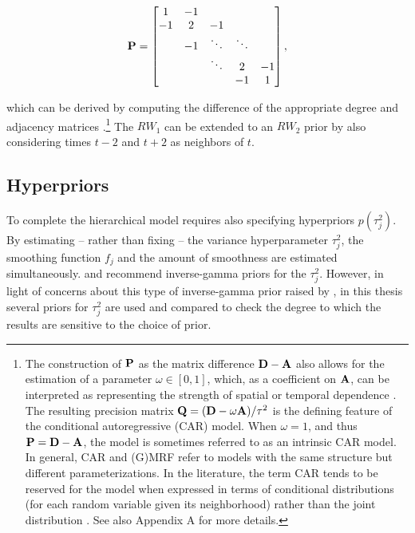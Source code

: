 \begin{equation*}
\mathbf{P} = 
\begin{bmatrix}
1  	& -1 	& 		& 	& \\
-1  	& 2 	& -1 		& 	& \\
  	& -1 & \ddots 	& \ddots	& \\
  	&  	& \ddots 	& 2 	& -1\\
  	&  	& 		& -1 	& 1\\
\end{bmatrix},
\end{equation*}

\noindent which can be derived by computing the difference of the appropriate degree 
and adjacency matrices .\footnote{The construction 
of $\mathbf{P}$ as the matrix difference $\mathbf{D} - \mathbf{A}$ also allows for the estimation 
of a parameter $\omega \in [0,1]$, which, as a coefficient on $\mathbf{A}$, can be 
interpreted as representing the strength of spatial or temporal dependence 
. The resulting precision matrix 
$\mathbf{Q}= (\mathbf{D} - \omega \mathbf{A})/\tau^2$ is the defining feature of the conditional 
autoregressive (CAR) model.  When $\omega = 1$, and thus $\mathbf{P}= \mathbf{D} - \mathbf{A}$, 
the model is sometimes referred to as an intrinsic CAR model. In general, CAR and (G)MRF 
refer to models with the same structure but different parameterizations. In the literature, the 
term CAR tends to be reserved for the model when expressed in terms of conditional 
distributions (for each random variable given its neighborhood) rather than the joint distribution . 
See also Appendix A %
for more details.\label{footnote_car}} 
The $RW_1$ can be extended to an $RW_2$ prior by also considering  
times $t-2$ and $t+2$ as neighbors of $t$. 


\subsection{Hyperpriors}
\label{hyperpriors}

To complete the hierarchical model requires also specifying hyperpriors $p(\tau_j^2)$.  
By estimating -- rather than fixing -- the variance hyperparameter $\tau_j^2$, the smoothing 
function $f_j$ and the amount of smoothness are estimated simultaneously. 
 and  recommend  
inverse-gamma priors for the $\tau_j^2$. However, in light of concerns about this type 
of inverse-gamma prior raised by , in this thesis several priors 
for $\tau^2_j$ are used and compared to check the degree to which the results are 
sensitive to the choice of prior.

